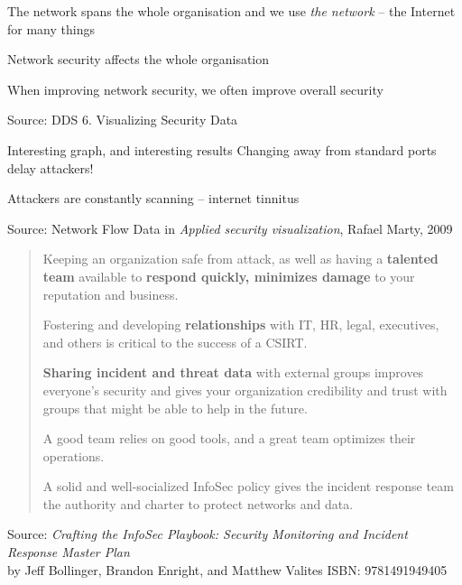 \documentclass[Screen16to9,17pt]{foils}
\begin{document}
\begin{list2}
\item The network spans the whole organisation and we use \emph{the network} -- the Internet for many things
\item Network security affects the whole organisation
\item When improving network security, we often improve overall security
\end{list2}


Source: DDS 6. Visualizing Security Data

\begin{list2}
\item Interesting graph, and interesting results Changing away from standard ports delay attackers!
\item Attackers are constantly scanning -- internet tinnitus
\end{list2}




Source: Network Flow Data in \emph{Applied security visualization}, Rafael Marty, 2009



\begin{quote}
\begin{list2}
\item Keeping an organization safe from attack, as well as having a {\bf talented team} available to {\bf respond quickly, minimizes damage} to your reputation and business.
\item Fostering and developing {\bf relationships} with IT, HR, legal, executives, and others is critical to the success of a CSIRT.
\item {\bf Sharing incident and threat data} with external groups improves everyone’s security and gives your organization credibility and trust with groups that might be able to help in the future.
\item A good team relies on good tools, and a great team optimizes their operations.
\item A solid and well-socialized InfoSec policy gives the incident response team the authority and charter to protect networks and data.
\end{list2}
\end{quote}
Source:
 \emph{Crafting the InfoSec Playbook: Security Monitoring and Incident Response Master Plan}\\
 by Jeff Bollinger, Brandon Enright, and Matthew Valites ISBN: 9781491949405
\end{document}
